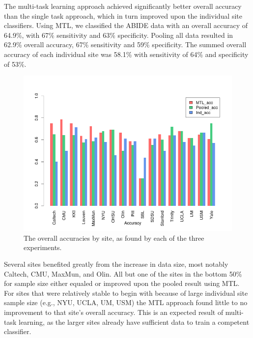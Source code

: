 \documentclass{llncs}
\begin{document}
The multi-task learning approach achieved significantly better overall accuracy than the single task approach, which in turn improved upon the individual site classifiers. Using MTL, we classified the ABIDE data with an  overall accuracy of 64.9\%, with 67\% sensitivity and 63\% specificity.  Pooling all data resulted in 62.9\% overall accuracy, 67\% sensitivity and 59\% specificity. The summed overall accuracy of each individual site was 58.1\% with sensitivity of 64\% and specificity of 53\%.
\begin{figure}
	\centering
	\includegraphics[scale = .4]{acc_bar.png}
	\caption{The overall accuracies by site, as found by each of the three experiments. }
	\label{fig:acc_bar}
\end{figure}


Several sites benefited greatly from the increase in data size, most notably
Caltech, CMU, MaxMun, and Olin.  All but one of the sites in the bottom 50\% for
sample size either equaled or improved upon the pooled result using MTL.  For
sites that were relatively stable to begin with because of large individual site
sample size (e.g., NYU, UCLA, UM, USM) the MTL approach found little to no
improvement to that site's overall accuracy. This is an expected result of
multi-task learning, as the larger sites already have sufficient data to train
a competent classifier.
\end{document}
